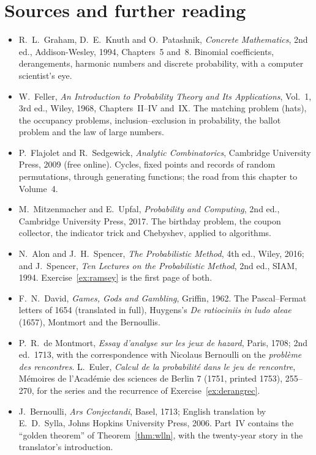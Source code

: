 \section*{Sources and further reading}

\begin{itemize}\raggedright
\item R.~L.~Graham, D.~E.~Knuth and O.~Patashnik, \emph{Concrete Mathematics}, 2nd ed., Addison-Wesley, 1994, Chapters~5 and~8. Binomial coefficients, derangements, harmonic numbers and discrete probability, with a computer scientist's eye.
\item W.~Feller, \emph{An Introduction to Probability Theory and Its Applications}, Vol.~1, 3rd ed., Wiley, 1968, Chapters~II--IV and~IX. The matching problem (hats), the occupancy problems, inclusion--exclusion in probability, the ballot problem and the law of large numbers.
\item P.~Flajolet and R.~Sedgewick, \emph{Analytic Combinatorics}, Cambridge University Press, 2009 (free online). Cycles, fixed points and records of random permutations, through generating functions; the road from this chapter to Volume~4.
\item M.~Mitzenmacher and E.~Upfal, \emph{Probability and Computing}, 2nd ed., Cambridge University Press, 2017. The birthday problem, the coupon collector, the indicator trick and Chebyshev, applied to algorithms.
\item N.~Alon and J.~H.~Spencer, \emph{The Probabilistic Method}, 4th ed., Wiley, 2016; and J.~Spencer, \emph{Ten Lectures on the Probabilistic Method}, 2nd ed., SIAM, 1994. Exercise~\ref{ex:ramsey} is the first page of both.
\item F.~N.~David, \emph{Games, Gods and Gambling}, Griffin, 1962. The Pascal--Fermat letters of 1654 (translated in full), Huygens's \emph{De ratiociniis in ludo aleae} (1657), Montmort and the Bernoullis.
\item P.~R.~de Montmort, \emph{Essay d'analyse sur les jeux de hazard}, Paris, 1708; 2nd ed.\ 1713, with the correspondence with Nicolaus Bernoulli on the \emph{probl\`eme des rencontres}. L.~Euler, \emph{Calcul de la probabilit\'e dans le jeu de rencontre}, M\'emoires de l'Acad\'emie des sciences de Berlin 7 (1751, printed 1753), 255--270, for the series and the recurrence of Exercise~\ref{ex:derangrec}.
\item J.~Bernoulli, \emph{Ars Conjectandi}, Basel, 1713; English translation by E.~D.~Sylla, Johns Hopkins University Press, 2006. Part~IV contains the ``golden theorem'' of Theorem~\ref{thm:wlln}, with the twenty-year story in the translator's introduction.

\end{itemize}
